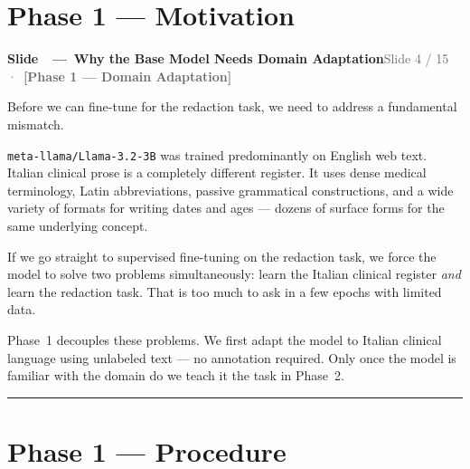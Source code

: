 \documentclass[11pt,a4paper]{article}
\newcommand{\phaselabel}[2]{\textbf{\textcolor{#1}{[#2]}}}
\newcounter{slidectr}
\newcommand{\slidescript}[3]{%
  \stepcounter{slidectr}
  \begin{slidebox}
    \noindent\textbf{Slide \theslidectr\ \,—\, #1}\hfill\small\textcolor{dimgray}{#2}
  \end{slidebox}
  \vspace{0.4em}
  #3
  \vspace{1.2em}
  \noindent\textcolor{dimgray!60}{\rule{\linewidth}{0.4pt}}
  \vspace{0.6em}
}
\begin{document}
\section{Phase 1 --- Motivation}

\slidescript{Why the Base Model Needs Domain Adaptation}{Slide 4 / 15 \,·\, \phaselabel{phase1}{Phase 1 — Domain Adaptation}}{

Before we can fine-tune for the redaction task, we need to address a fundamental mismatch.

\texttt{meta-llama/Llama-3.2-3B} was trained predominantly on English web text. Italian clinical prose is a completely different register. It uses dense medical terminology, Latin abbreviations, passive grammatical constructions, and a wide variety of formats for writing dates and ages — dozens of surface forms for the same underlying concept.

If we go straight to supervised fine-tuning on the redaction task, we force the model to solve two problems simultaneously: learn the Italian clinical register \emph{and} learn the redaction task. That is too much to ask in a few epochs with limited data.

Phase~1 decouples these problems. We first adapt the model to Italian clinical language using unlabeled text — no annotation required. Only once the model is familiar with the domain do we teach it the task in Phase~2.

}

\section{Phase 1 --- Procedure}
\end{document}
